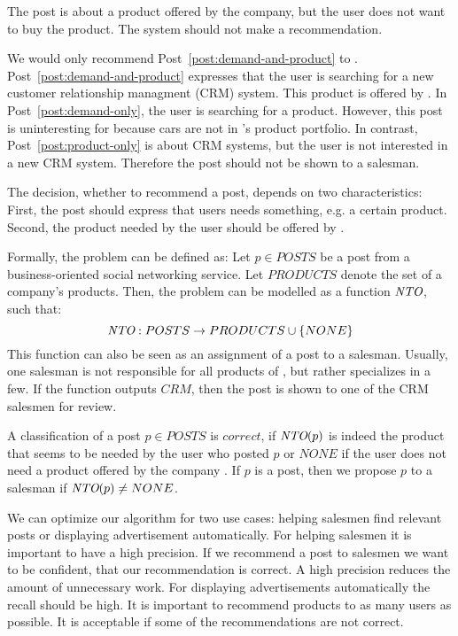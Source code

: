 \begin{post}
	\centering
	\caption{The post is about a product offered by the company, but the user does not want to buy the product. The system should not make a recommendation.}
	\label{post:product-only}
\end{post}

We would only recommend Post~\ref{post:demand-and-product} to \acme.
Post~\ref{post:demand-and-product} expresses that the user is searching for a new customer relationship managment (CRM) system.
This product is offered by \acme.
In Post~\ref{post:demand-only}, the user is searching for a product.
However, this post is uninteresting for \acme because cars are not in \acme's product portfolio.
In contrast, Post~\ref{post:product-only} is about CRM systems, but the user is not interested in a new CRM system.
Therefore the post should not be shown to a salesman.

The decision, whether to recommend a post, depends on two characteristics:
First, the post should express that users needs something, e.g. a certain product.
Second, the product needed by the user should be offered by \acme.

Formally, the problem can be defined as:
Let $p \in POSTS$ be a post from a business-oriented social networking service.
Let $PRODUCTS$ denote the set of a company's products.
Then, the problem can be modelled as a function $\emph{NTO}$, such that:
\begin{displaymath}
	\emph{NTO}: POSTS \to PRODUCTS \cup \{NONE\}
\end{displaymath}
This function can also be seen as an assignment of a post to a salesman.
Usually, one salesman is not responsible for all products of \acme, but rather specializes in a few.
If the \nto function outputs $CRM$, then the post is shown to one of the CRM salesmen for review.

A classification of a post $p \in POSTS$ is $correct$, if $\emph{NTO}(p)$ is indeed the product that seems to be needed by the user who posted $p$ or $NONE$ if the user does not need a product offered by the company \acme.
If $p$ is a post, then we propose $p$ to a salesman if $\emph{NTO}(p) \neq NONE$.

We can optimize our algorithm for two use cases: helping salesmen find relevant posts or displaying advertisement automatically.
For helping salesmen it is important to have a high precision.
If we recommend a post to salesmen we want to be confident, that our recommendation is correct.
A high precision reduces the amount of unnecessary work.
For displaying advertisements automatically the recall should be high.
It is important to recommend products to as many users as possible.
It is acceptable if some of the recommendations are not correct.

